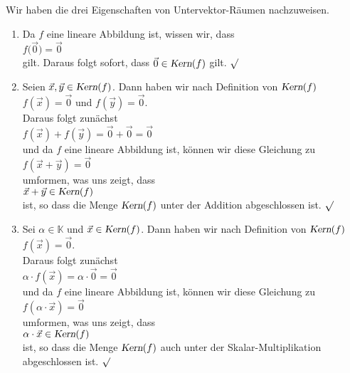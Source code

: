 \proof
Wir haben die drei Eigenschaften von Untervektor-R\"{a}umen nachzuweisen. 
\begin{enumerate}
\item Da $f$ eine lineare Abbildung ist, wissen wir, dass
      \\[0.2cm]
      \hspace*{1.3cm}
      $f\bigl(\vec{0}\bigr) = \vec{0}$
      \\[0.2cm]
      gilt.  Daraus folgt sofort, dass $\vec{0} \in \textsl{Kern}(f)$ gilt. $\surd$ 
\item Seien $\vec{x}, \vec{y} \in \textsl{Kern}(f)$.  Dann haben wir nach Definition von $\textsl{Kern}(f)$
      \\[0.2cm]
      \hspace*{1.3cm}
      $f(\vec{x}) = \vec{0}$ \quad und \quad $f(\vec{y}) = \vec{0}$. 
      \\[0.2cm]
      Daraus folgt zun\"{a}chst
      \\[0.2cm]
      \hspace*{1.3cm}
      $f(\vec{x}) + f(\vec{y}) = \vec{0} + \vec{0} = \vec{0}$
      \\[0.2cm]
      und da $f$ eine lineare Abbildung ist, k\"{o}nnen wir diese Gleichung zu
      \\[0.2cm]
      \hspace*{1.3cm}
      $f(\vec{x} + \vec{y}) = \vec{0}$
      \\[0.2cm]
      umformen, was uns zeigt, dass
      \\[0.2cm]
      \hspace*{1.3cm}
      $\vec{x} + \vec{y} \in \textsl{Kern}(f)$ 
      \\[0.2cm]
      ist, so dass die Menge $\textsl{Kern}(f)$ unter der Addition abgeschlossen ist. $\surd$
\item Sei $\alpha \in \mathbb{K}$ und $\vec{x} \in \textsl{Kern}(f)$.  Dann haben wir nach Definition von $\textsl{Kern}(f)$
      \\[0.2cm]
      \hspace*{1.3cm}
      $f(\vec{x}) = \vec{0}$. 
      \\[0.2cm]
      Daraus folgt zun\"{a}chst
      \\[0.2cm]
      \hspace*{1.3cm}
      $\alpha \cdot f(\vec{x}) = \alpha \cdot \vec{0} = \vec{0}$
      \\[0.2cm]
      und da $f$ eine lineare Abbildung ist, k\"{o}nnen wir diese Gleichung zu
      \\[0.2cm]
      \hspace*{1.3cm}
      $f(\alpha \cdot \vec{x}) = \vec{0}$
      \\[0.2cm]
      umformen, was uns zeigt, dass
      \\[0.2cm]
      \hspace*{1.3cm}
      $\alpha \cdot \vec{x} \in \textsl{Kern}(f)$ 
      \\[0.2cm]
      ist, so dass die Menge $\textsl{Kern}(f)$ auch unter der Skalar-Multiplikation abgeschlossen ist. $\surd$
      \qeds
\end{enumerate}

